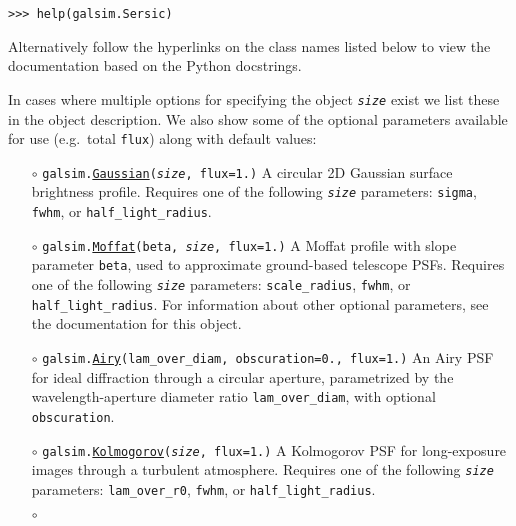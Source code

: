\documentclass[preprint,10pt]{../../devel/modules/aastex}
\begin{document}
\texttt{>>> help(galsim.Sersic)}

Alternatively follow the hyperlinks on
the class names listed below to view the documentation based
on the Python docstrings.

In cases where multiple options for specifying the object \emph{\texttt{size}}
exist we list these in the object description. We also show some of the optional
parameters available for use (e.g.\ total \texttt{flux}) along with default values:
\begin{itemize}
\item[$\circ$]
  \texttt{galsim.}\href{http://galsim-developers.github.io/GalSim/classgalsim_1_1base_1_1_gaussian.html}{\texttt{Gaussian}}\texttt{(\emph{size}, flux=1.)}
    \newline 
    A circular 2D Gaussian surface brightness profile. Requires one of the
    following \emph{\texttt{size}} parameters: \texttt{sigma}, \texttt{fwhm}, or \texttt{half\_light\_radius}.
\item[$\circ$]
  \texttt{galsim.}\href{http://galsim-developers.github.com/GalSim/classgalsim_1_1base_1_1_moffat.html}{\texttt{Moffat}}\texttt{(beta, \emph{size}, flux=1.)}
    \newline 
    A Moffat profile with slope parameter \texttt{beta}, used to approximate ground-based
    telescope PSFs. Requires one of the
    following \emph{\texttt{size}} parameters: \texttt{scale\_radius},
    \texttt{fwhm}, or \texttt{half\_light\_radius}.  For information
    about other optional parameters, see the documentation for this object.
\item[$\circ$]
  \texttt{galsim.}\href{http://galsim-developers.github.com/GalSim/classgalsim_1_1base_1_1_airy.html}{\texttt{Airy}}\texttt{(lam\_over\_diam, obscuration=0., flux=1.)}
    \newline 
    An Airy PSF for ideal diffraction
    through a circular aperture, parametrized by the wavelength-aperture
    diameter ratio \texttt{lam\_over\_diam}, with optional
    \texttt{obscuration}.
\item[$\circ$]
  \texttt{galsim.}\href{http://galsim-developers.github.com/GalSim/classgalsim_1_1base_1_1_kolmogorov.html}{\texttt{Kolmogorov}}\texttt{(\emph{size}, flux=1.)}
    \newline 
    A Kolmogorov PSF for long-exposure
    images through a turbulent atmosphere. Requires one of the
    following \emph{\texttt{size}} parameters: \texttt{lam\_over\_r0}, \texttt{fwhm}, or
    \texttt{half\_light\_radius}.
\item[$\circ$]

\end{itemize}
\end{document}
